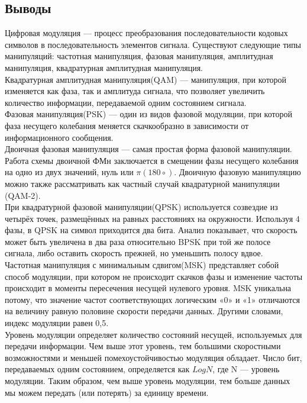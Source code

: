 \subsection{Выводы}
\noindent Цифровая модуляция — процесс преобразования последовательности кодовых символов в последовательность элементов сигнала. Существуют следующие типы манипуляций: частотная манипуляция, фазовая манипуляция, амплитудная манипуляция, квадратурная амплитудная манипуляция.\\
Квадратурная амплитудная манипуляция(QAM) — манипуляция, при которой изменяется как фаза, так и амплитуда сигнала, что позволяет увеличить количество информации, передаваемой одним состоянием сигнала. \\
Фазовая манипуляция(PSK) — один из видов фазовой модуляции, при которой фаза несущего колебания меняется скачкообразно в зависимости от информационного сообщения.\\
Двоичная фазовая манипуляция — самая простая форма фазовой манипуляции. Работа схемы двоичной ФМн заключается в смещении фазы несущего колебания на одно из двух значений, нуль или $\pi (180\circ)$. Двоичную фазовую манипуляцию можно также рассматривать как частный случай квадратурной манипуляции (QAM-2).\\
При квадратурной фазовой манипуляции(QPSK) используется созвездие из четырёх точек, размещённых на равных расстояниях на окружности. Используя 4 фазы, в QPSK на символ приходится два бита. Анализ показывает, что скорость может быть увеличена в два раза относительно BPSK при той же полосе сигнала, либо оставить скорость прежней, но уменьшить полосу вдвое.\\
Частотная манипуляция с минимальным сдвигом(MSK) представляет собой способ модуляции, при котором не происходит скачков фазы и изменение частоты происходит в моменты пересечения несущей нулевого уровня. MSK уникальна потому, что значение частот соответствующих логическим «0» и «1» отличаются на величину равную половине скорости передачи данных. Другими словами, индекс модуляции равен 0,5.\\
Уровень модуляции определяет количество состояний несущей, используемых для передачи информации. Чем выше этот уровень, тем большими скоростными возможностями и меньшей помехоустойчивостью модуляция обладает. Число бит, передаваемых одним состоянием, определяется как $Log N$, где N — уровень модуляции. Таким образом, чем выше уровень модуляции, тем больше данных мы можем передать (или потерять) за единицу времени.

